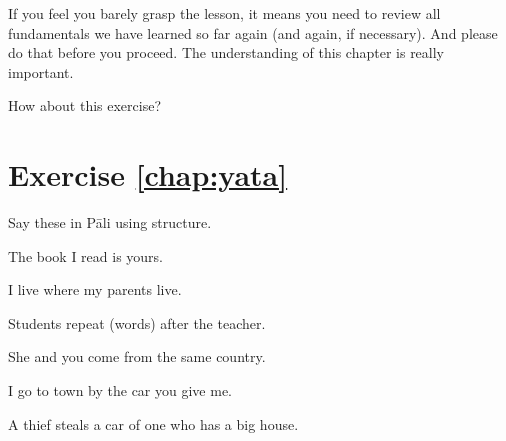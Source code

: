 If you feel you barely grasp the lesson, it means you need to review all fundamentals we have learned so far again (and again, if necessary). And please do that before you proceed. The understanding of this chapter is really important.

How about this exercise?

\section*{Exercise \ref{chap:yata}}
Say these in P\=ali using  structure.
\begin{compactenum}
\item The book I read is yours.
\item I live where my parents live.
\item Students repeat (words) after the teacher.
\item She and you come from the same country.
\item I go to town by the car you give me.
\item A thief steals a car of one who has a big house.
\end{compactenum}
